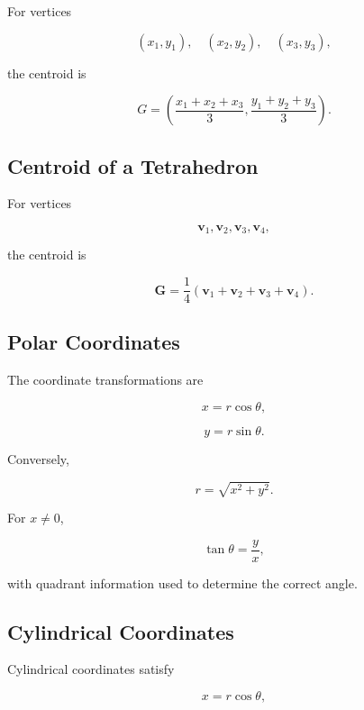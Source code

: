 For vertices

\[
(x_1,y_1),
\quad
(x_2,y_2),
\quad
(x_3,y_3),
\]

the centroid is

\[
\boxed{
G
=
\left(
\frac{x_1+x_2+x_3}{3},
\frac{y_1+y_2+y_3}{3}
\right).
}
\]

\subsection{Centroid of a Tetrahedron}
\label{subsec:tetrahedron-centroid-reference}

For vertices

\[
\mathbf{v}_1,
\mathbf{v}_2,
\mathbf{v}_3,
\mathbf{v}_4,
\]

the centroid is

\[
\boxed{
\mathbf{G}
=
\frac14
\left(
\mathbf{v}_1+
\mathbf{v}_2+
\mathbf{v}_3+
\mathbf{v}_4
\right).
}
\]

\subsection{Polar Coordinates}
\label{subsec:polar-coordinate-formulas}

The coordinate transformations are

\[
\boxed{
x=r\cos\theta,
}
\]

\[
\boxed{
y=r\sin\theta.
}
\]

Conversely,

\[
\boxed{
r
=
\sqrt{x^2+y^2}.
}
\]

For \(x\neq0\),

\[
\tan\theta
=
\frac{y}{x},
\]

with quadrant information used to determine the correct angle.

\subsection{Cylindrical Coordinates}
\label{subsec:cylindrical-coordinate-formulas}

Cylindrical coordinates satisfy

\[
\boxed{
x=r\cos\theta,
}
\]


